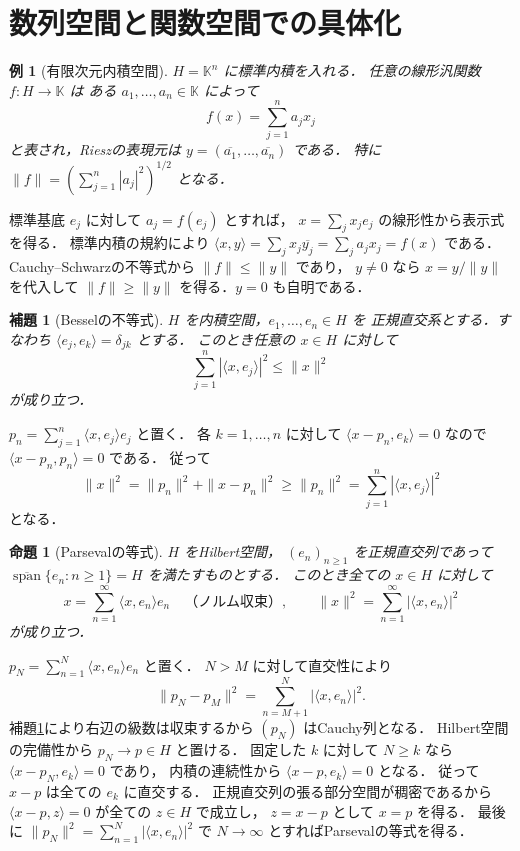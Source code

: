 \documentclass[a5paper,10pt,onecolumn]{jsarticle}
\makeatletter
\theoremstyle{mathnotetheorem}
\newtheorem{lemma}[theorem]{補題}
\newtheorem{proposition}[theorem]{命題}
\newtheorem{example}[theorem]{例}
\renewcommand{\proofname}{証明}
\renewenvironment{proof}[1][\proofname]{%
  \par\pushQED{\qed}\normalfont\topsep4\p@\@plus2\p@\relax
  \trivlist\item[\hskip\labelsep\bfseries #1]\ignorespaces
}{\popQED\endtrivlist\@endpefalse}
\makeatother
\begin{document}
\section{数列空間と関数空間での具体化}

\begin{example}[有限次元内積空間]
$H=\mathbb K^n$ に標準内積を入れる．
任意の線形汎関数 $f:H\to\mathbb K$ は
ある $a_1,\dots,a_n\in\mathbb K$ によって
\[
 f(x)=\sum_{j=1}^n a_jx_j
\]
と表され，Rieszの表現元は
$y=(\overline{a_1},\dots,\overline{a_n})$ である．
特に $\|f\|=(\sum_{j=1}^n|a_j|^2)^{1/2}$ となる．
\end{example}
\begin{proof}
標準基底 $e_j$ に対して $a_j=f(e_j)$ とすれば，
$x=\sum_jx_je_j$ の線形性から表示式を得る．
標準内積の規約により
$\langle x,y\rangle=\sum_jx_j\overline{y_j}
=\sum_j a_jx_j=f(x)$ である．
Cauchy--Schwarzの不等式から $\|f\|\le\|y\|$ であり，
$y\ne0$ なら $x=y/\|y\|$ を代入して
$\|f\|\ge\|y\|$ を得る．$y=0$ も自明である．
\end{proof}

\begin{lemma}[Besselの不等式]\label{lem:bessel}
$H$ を内積空間，$e_1,\dots,e_n\in H$ を
正規直交系とする．すなわち
$\langle e_j,e_k\rangle=\delta_{jk}$ とする．
このとき任意の $x\in H$ に対して
\[
 \sum_{j=1}^n|\langle x,e_j\rangle|^2\le\|x\|^2
\]
が成り立つ．
\end{lemma}
\begin{proof}
$p_n=\sum_{j=1}^n\langle x,e_j\rangle e_j$ と置く．
各 $k=1,\dots,n$ に対して
$\langle x-p_n,e_k\rangle=0$ なので
$\langle x-p_n,p_n\rangle=0$ である．
従って
\[
 \|x\|^2=\|p_n\|^2+\|x-p_n\|^2
 \ge\|p_n\|^2
 =\sum_{j=1}^n|\langle x,e_j\rangle|^2
\]
となる．
\end{proof}

\begin{proposition}[Parsevalの等式]\label{prop:parseval}
$H$ をHilbert空間，
$(e_n)_{n\ge1}$ を正規直交列であって
$\overline{\operatorname{span}}\{e_n:n\ge1\}=H$
を満たすものとする．
このとき全ての $x\in H$ に対して
\[
 x=\sum_{n=1}^\infty\langle x,e_n\rangle e_n
 \quad\text{（ノルム収束）},\qquad
 \|x\|^2=\sum_{n=1}^\infty|\langle x,e_n\rangle|^2
\]
が成り立つ．
\end{proposition}
\begin{proof}
$p_N=\sum_{n=1}^N\langle x,e_n\rangle e_n$ と置く．
$N>M$ に対して直交性により
\[
 \|p_N-p_M\|^2
 =\sum_{n=M+1}^N|\langle x,e_n\rangle|^2.
\]
補題\ref{lem:bessel}により右辺の級数は収束するから
$(p_N)$ はCauchy列となる．
Hilbert空間の完備性から $p_N\to p\in H$ と置ける．
固定した $k$ に対して $N\ge k$ なら
$\langle x-p_N,e_k\rangle=0$ であり，
内積の連続性から $\langle x-p,e_k\rangle=0$ となる．
従って $x-p$ は全ての $e_k$ に直交する．
正規直交列の張る部分空間が稠密であるから
$\langle x-p,z\rangle=0$ が全ての $z\in H$ で成立し，
$z=x-p$ として $x=p$ を得る．
最後に $\|p_N\|^2
=\sum_{n=1}^N|\langle x,e_n\rangle|^2$ で
$N\to\infty$ とすればParsevalの等式を得る．
\end{proof}
\end{document}
